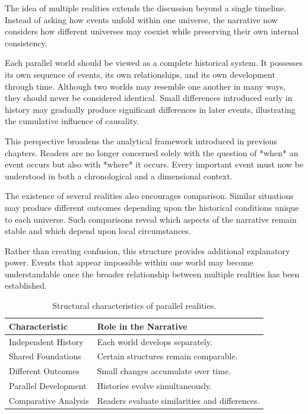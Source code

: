 \documentclass[12pt,oneside,openany]{book}
\begin{document}
The idea of multiple realities extends the discussion beyond a single timeline.
Instead of asking how events unfold within one universe, the narrative now
considers how different universes may coexist while preserving their own
internal consistency.

Each parallel world should be viewed as a complete historical system. It
possesses its own sequence of events, its own relationships, and its own
development through time. Although two worlds may resemble one another in many
ways, they should never be considered identical. Small differences introduced
early in history may gradually produce significant differences in later events,
illustrating the cumulative influence of causality.

This perspective broadens the analytical framework introduced in previous
chapters. Readers are no longer concerned solely with the question of *when* an
event occurs but also with *where* it occurs. Every important event must now be
understood in both a chronological and a dimensional context.

The existence of several realities also encourages comparison. Similar
situations may produce different outcomes depending upon the historical
conditions unique to each universe. Such comparisons reveal which aspects of
the narrative remain stable and which depend upon local circumstances.

Rather than creating confusion, this structure provides additional explanatory
power. Events that appear impossible within one world may become understandable
once the broader relationship between multiple realities has been established.

\begin{table}[H]
\centering
\begin{tabular}{|p{4.3cm}|p{7.7cm}|}
\hline
\textbf{Characteristic} & \textbf{Role in the Narrative}\\
\hline
Independent History & Each world develops separately.\\
\hline
Shared Foundations & Certain structures remain comparable.\\
\hline
Different Outcomes & Small changes accumulate over time.\\
\hline
Parallel Development & Histories evolve simultaneously.\\
\hline
Comparative Analysis & Readers evaluate similarities and differences.\\
\hline
\end{tabular}
\caption{Structural characteristics of parallel realities.}
\end{table}
\end{document}
